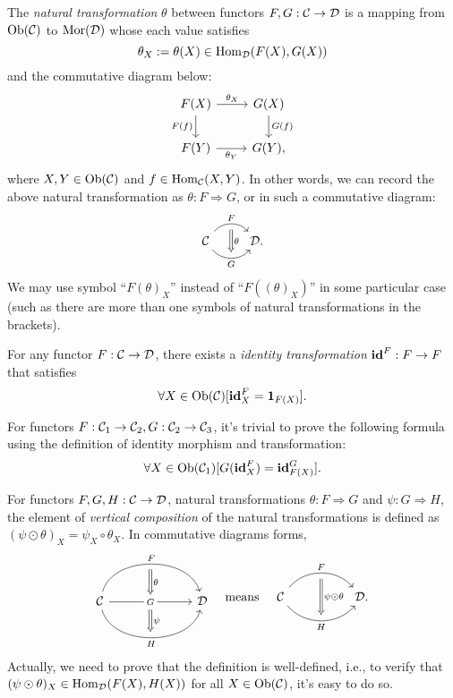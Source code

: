 \documentclass{article}
\begin{document}
\begin{defi}\label{natural transformation}
	The \emph{natural transformation} $\theta$ between functors $F,G:\mathcal{C}\to\mathcal{D}$ is a mapping from $\mathrm{Ob}(\mathcal{C})$ to $\mathrm{Mor}(\mathcal{D})$ whose each value satisfies
	\[\theta_X:=\theta(X)\in\mathrm{Hom}_{\mathcal{D}}(F(X),G(X))\]
	and the commutative diagram below:
	\begin{equation}\begin{tikzcd}\label{ntr}
		F(X) \arrow[r,"\theta_X"] \arrow[d,"F(f)"'] & G(X) \arrow[d,"G(f)"]\\
		F(Y) \arrow[r,"\theta_Y"'] & G(Y),
	\end{tikzcd}\end{equation}
	where $X,Y\in\mathrm{Ob}(\mathcal{C})$ and $f\in\mathrm{Hom}_{\mathcal{C}}(X,Y)$. In other words, we can record the above natural transformation as $\theta:F\Rightarrow G$, or in such a commutative diagram:
	\[\begin{tikzcd}
			\C \arrow[r, "F", bend left=50, ""' name=F] \arrow[r, "G"', bend right=50, "" name=G] & \arrow[Rightarrow, from=F, to=G, "\theta"] \D.
	\end{tikzcd}\]
	We may use symbol ``$F(\theta)_X$'' instead of ``$F((\theta)_X)$'' in some particular case (such as there are more than one symbols of natural transformations in the brackets).
	
	For any functor $F:\mathcal{C}\to\mathcal{D}$, there exists a \emph{identity transformation} $\mathbf{id}^F:F\to F$ that satisfies
	 \[\forall X\in\mathrm{Ob}(\mathcal{C})[\mathbf{id}^F_X=\mathbf{1}_{F(X)}].\]
	
	For functors $F:\mathcal{C}_1\to\mathcal{C}_2,G:\mathcal{C}_2\to\mathcal{C}_3$, it's trivial to prove the following formula using the definition of identity morphism and transformation:
	\begin{equation}\label{id}
		\forall X\in\mathrm{Ob}(\mathcal{C}_1)[G(\mathbf{id}^F_X)=\mathbf{id}^G_{F(X)}].
	\end{equation}
\end{defi}


\begin{defi}\label{vertical composition}
	For functors $F,G,H:\mathcal{C}\to\mathcal{D}$, natural transformations $\theta:F\Rightarrow G$ and $\psi:G\Rightarrow H$, the element of \emph{vertical composition} of the natural transformations is defined as $(\psi\odot\theta)_X=\psi_X\circ\theta_X$. In commutative diagrams forms,
	\[\begin{tikzcd}
			& \arrow[d,Rightarrow,"\theta"] & \\
			\C \arrow[rr, "F", bend left=75] \arrow[rr, "H"', bend right=75] \arrow[rr, "G" description] &
			\textcolor{white}{s} \arrow[d,Rightarrow,"\psi"] &
			\D\\ & \quad &
		\end{tikzcd}\quad\text{means}\quad\begin{tikzcd}
			\C
			\arrow[bend left=50, rr, "F", ""' name=F]
			\arrow[bend right=50, rr, "H"', "" name=H] & & 
			\arrow[Rightarrow, from=F, to=H, "\psi\odot\theta"] \D.
	\end{tikzcd}\]
	Actually, we need to prove that the definition is well-defined, i.e., to verify that $(\psi\odot\theta)_X\in\mathrm{Hom}_{\mathcal{D}}(F(X),H(X))$ for all $X\in\mathrm{Ob}(\mathcal{C})$, it's easy to do so.
\end{defi}
\end{document}
